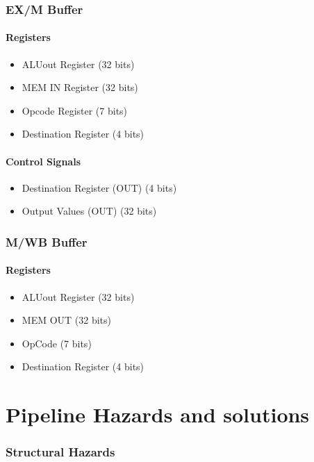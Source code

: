 \documentclass[12pt]{report}
\begin{document}
\section{EX/M Buffer}

\subsection{Registers}
\begin{itemize}
    \item ALUout Register (32 bits)
    \item MEM IN Register (32 bits)
    \item Opcode Register (7 bits)
    \item Destination Register (4 bits)
\end{itemize}

\subsection{Control Signals}
\begin{itemize}
    \item Destination Register (OUT) (4 bits)
    \item Output Values (OUT) (32 bits)
\end{itemize}

\section{M/WB Buffer}

\subsection{Registers}
\begin{itemize}
    \item ALUout Register (32 bits)
    \item MEM OUT (32 bits)
    \item OpCode (7 bits)
    \item Destination Register (4 bits)
\end{itemize}

\part{Pipeline Hazards and solutions}

\section{Structural Hazards}
\end{document}
